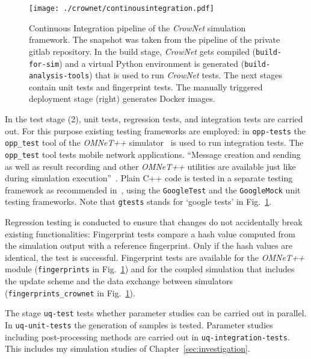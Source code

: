 \begin{figure}[hbt!]
\texttt{[image: ./crownet/continousintegration.pdf]} 
\caption[Continuous Integration pipeline of the \textit{CrowNet} simulation framework]{Continuous Integration pipeline of the \textit{CrowNet} simulation framework. The snapshot was taken from the pipeline of the private gitlab repository. In the build stage, \textit{CrowNet} gets compiled (\lstinline{build-for-sim}) and a virtual Python environment is generated (\lstinline{build-analysis-tools}) that is used to run \textit{CrowNet} tests. The next stages contain unit tests and fingerprint tests. 
The manually triggered deployment stage (right) generates Docker images.   }
\label{fig:cicd}
\end{figure}


In the test stage (2), unit tests, regression tests, and integration tests are carried out.
For this purpose existing testing frameworks are employed: in \lstinline{opp-tests} the \lstinline{opp_test} tool of the \textit{OMNeT++} simulator~\cite{virdis-2019-com} is used to run integration tests. The \lstinline{opp_test} tool tests mobile network applications.  \enquote{Message creation and sending as well as result recording and other \textit{OMNeT++} utilities are available just like during simulation execution}~\cite[p.232]{virdis-2019-com}.
Plain C++ code is tested in a separate testing framework as recommended in~\cite{virdis-2019-com}, using the \lstinline{GoogleTest} and  the \lstinline{GoogleMock} unit testing frameworks. Note that \lstinline{gtests} stands for `google tests' in Fig.~\ref{fig:cicd}.


Regression testing is conducted to ensure that changes do not accidentally break existing functionalities: Fingerprint tests  compare a hash value computed from the simulation output with a reference fingerprint. Only if the hash values are identical, the test is successful. Fingerprint tests are available for the \textit{OMNeT++} module (\lstinline{fingerprints} in Fig.~\ref{fig:cicd}) and for the coupled simulation that includes the update scheme and the data exchange between simulators (\lstinline{fingerprints_crownet} in Fig.~\ref{fig:cicd}).


The stage \lstinline{uq-test} tests whether parameter studies can be carried out in parallel. In \lstinline{uq-unit-tests} the generation of samples is tested. Parameter studies including post-processing methods are carried out in \lstinline{uq-integration-tests}. This includes my simulation studies of Chapter~\ref{sec:investigation}. 

